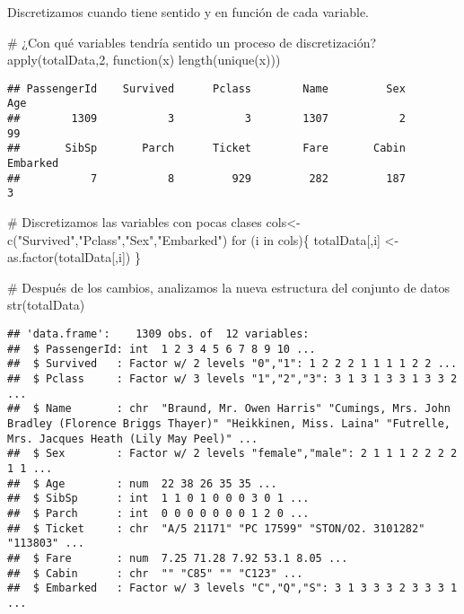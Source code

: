 \documentclass[]{article}
\newenvironment{Shaded}{\begin{snugshade}}{\end{snugshade}}
\newcommand{\CommentTok}[1]{\textcolor[rgb]{0.50,0.62,0.50}{#1}}
\newcommand{\ControlFlowTok}[1]{\textcolor[rgb]{0.94,0.87,0.69}{#1}}
\newcommand{\DecValTok}[1]{\textcolor[rgb]{0.86,0.86,0.80}{#1}}
\newcommand{\KeywordTok}[1]{\textcolor[rgb]{0.94,0.87,0.69}{#1}}
\newcommand{\NormalTok}[1]{\textcolor[rgb]{0.80,0.80,0.80}{#1}}
\newcommand{\StringTok}[1]{\textcolor[rgb]{0.80,0.58,0.58}{#1}}
\begin{document}
Discretizamos cuando tiene sentido y en función de cada variable.

\begin{Shaded}
\begin{Highlighting}[]
\CommentTok{\# ¿Con qué variables tendría sentido un proceso de discretización?}
\KeywordTok{apply}\NormalTok{(totalData,}\DecValTok{2}\NormalTok{, }\ControlFlowTok{function}\NormalTok{(x) }\KeywordTok{length}\NormalTok{(}\KeywordTok{unique}\NormalTok{(x)))}
\end{Highlighting}
\end{Shaded}

\begin{verbatim}
## PassengerId    Survived      Pclass        Name         Sex         Age 
##        1309           3           3        1307           2          99 
##       SibSp       Parch      Ticket        Fare       Cabin    Embarked 
##           7           8         929         282         187           3
\end{verbatim}

\begin{Shaded}
\begin{Highlighting}[]
\CommentTok{\# Discretizamos las variables con pocas clases}
\NormalTok{cols\textless{}{-}}\KeywordTok{c}\NormalTok{(}\StringTok{"Survived"}\NormalTok{,}\StringTok{"Pclass"}\NormalTok{,}\StringTok{"Sex"}\NormalTok{,}\StringTok{"Embarked"}\NormalTok{)}
\ControlFlowTok{for}\NormalTok{ (i }\ControlFlowTok{in}\NormalTok{ cols)\{}
\NormalTok{  totalData[,i] \textless{}{-}}\StringTok{ }\KeywordTok{as.factor}\NormalTok{(totalData[,i])}
\NormalTok{\}}

\CommentTok{\# Después de los cambios, analizamos la nueva estructura del conjunto de datos}
\KeywordTok{str}\NormalTok{(totalData)}
\end{Highlighting}
\end{Shaded}

\begin{verbatim}
## 'data.frame':    1309 obs. of  12 variables:
##  $ PassengerId: int  1 2 3 4 5 6 7 8 9 10 ...
##  $ Survived   : Factor w/ 2 levels "0","1": 1 2 2 2 1 1 1 1 2 2 ...
##  $ Pclass     : Factor w/ 3 levels "1","2","3": 3 1 3 1 3 3 1 3 3 2 ...
##  $ Name       : chr  "Braund, Mr. Owen Harris" "Cumings, Mrs. John Bradley (Florence Briggs Thayer)" "Heikkinen, Miss. Laina" "Futrelle, Mrs. Jacques Heath (Lily May Peel)" ...
##  $ Sex        : Factor w/ 2 levels "female","male": 2 1 1 1 2 2 2 2 1 1 ...
##  $ Age        : num  22 38 26 35 35 ...
##  $ SibSp      : int  1 1 0 1 0 0 0 3 0 1 ...
##  $ Parch      : int  0 0 0 0 0 0 0 1 2 0 ...
##  $ Ticket     : chr  "A/5 21171" "PC 17599" "STON/O2. 3101282" "113803" ...
##  $ Fare       : num  7.25 71.28 7.92 53.1 8.05 ...
##  $ Cabin      : chr  "" "C85" "" "C123" ...
##  $ Embarked   : Factor w/ 3 levels "C","Q","S": 3 1 3 3 3 2 3 3 3 1 ...
\end{verbatim}
\end{document}
